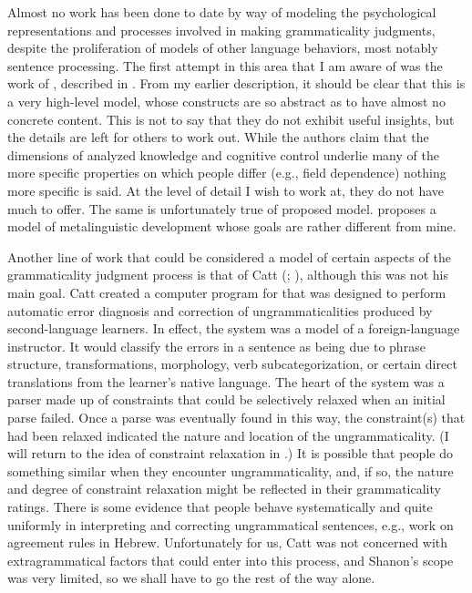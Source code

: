 Almost no work has been done to date by way of modeling the psychological representations and processes involved in making grammaticality judgments, despite the proliferation of models of other language behaviors, most notably sentence processing. The first attempt in this area that I am aware of was the work of \citet{BialystokEtAl1985}, described in . From my earlier description, it should be clear that this is a very high-level model, whose constructs are so abstract as to have almost no concrete content. This is not to say that they do not exhibit useful insights, but the details are left for others to work out. While the authors claim that the dimensions of analyzed knowledge and cognitive control underlie many of the more specific properties on which people differ (e.g., field dependence) nothing more specific is said. At the level of detail I wish to work at, they do not have much to offer. The same is unfortunately true of  proposed model. \citet{Gombert1992} proposes a model of metalinguistic development whose goals are rather different from mine.

Another line of work that could be considered a model of certain aspects of  the grammaticality judgment  process is that of Catt (\citeyear{Catt1988}; \citealt{CattEtAl1990}),
although this was not his main goal. Catt created a computer program for  that was designed to perform automatic error diagnosis and correction of ungrammaticalities produced by second-language learners. In effect, the system was a model of a foreign-language instructor. It would classify the errors in a sentence as being due to phrase structure, transformations, morphology, verb subcategorization, or certain direct translations from the learner's native language. The heart of the system was a parser made up of
constraints that could be selectively relaxed when an initial parse failed. Once a parse was eventually found in this way, the constraint(s) that had been relaxed indicated the nature and location of the ungrammaticality. (I will return to the idea of constraint relaxation in .) It is possible that people do something similar when they encounter ungrammaticality, and, if so, the nature and degree of constraint relaxation might be reflected in their grammaticality ratings. There is some evidence that people behave systematically and quite uniformly in interpreting and correcting ungrammatical sentences, e.g.,  work on agreement rules in Hebrew. Unfortunately for us, Catt was not concerned with extragrammatical factors that could enter into this process, and Shanon's scope was very limited, so we shall have to go the rest of the way alone.

